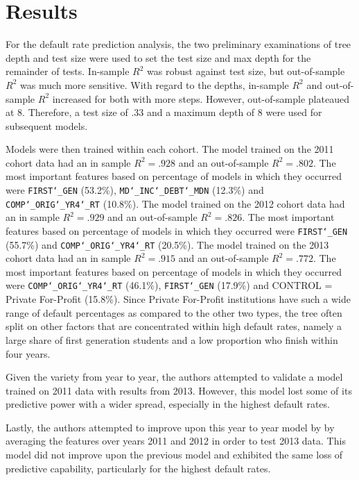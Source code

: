 \documentclass[10pt,twocolumn]{article}
\begin{document}
\section{Results}

For the default rate prediction analysis, the two preliminary examinations of tree depth and test size were used to set the
test size and max depth for the remainder of tests. In-sample $R^2$ was robust against test
 size, but out-of-sample $R^2$ was much more sensitive. With regard to the depths,
in-sample $R^2$ and out-of-sample $R^2$ increased for both with more steps. However,
out-of-sample plateaued at 8. Therefore, a test size of .33 and a maximum depth of 8 were
used for subsequent models.

Models were then trained within each cohort. The model trained on the 2011 cohort data
had an in sample $R^2 = .928$ and an out-of-sample $R^2 = .802$. The most important
features based on percentage of models in which they occurred were \texttt{FIRST\char`_GEN} (53.2\%),
\texttt{MD\char`_INC\char`_DEBT\char`_MDN} (12.3\%) and \texttt{COMP\char`_ORIG\char`_YR4\char`_RT} (10.8\%).
The model trained on the 2012 cohort data
had an in sample $R^2 = .929$ and an out-of-sample $R^2 = .826$. The most important
features based on percentage of models in which they occurred were \texttt{FIRST\char`_GEN} (55.7\%)
and \texttt{COMP\char`_ORIG\char`_YR4\char`_RT} (20.5\%). The model trained on the 2013 cohort data
had an in sample $R^2 = .915$ and an out-of-sample $R^2 = .772$. The most important
features based on percentage of models in which they occurred were
\texttt{COMP\char`_ORIG\char`_YR4\char`_RT} (46.1\%),
\texttt{FIRST\char`_GEN} (17.9\%) and CONTROL = Private For-Profit (15.8\%). Since Private For-Profit
institutions have such a wide range of default percentages as compared to the other two types,
the tree often split on other factors that are concentrated within high default rates, namely
a large share of first generation students and a low proportion who finish within four
years.

Given the variety from year to year, the authors attempted to validate a model
trained on 2011 data with results from 2013. However, this model lost some of its
predictive power with a wider spread, especially in the highest default rates.

Lastly, the authors attempted to improve upon this year to year model by by averaging
the features over years 2011 and 2012 in order to test 2013 data. This model did
not improve upon the previous model and exhibited the same loss of predictive capability,
particularly for the highest default rates.
\end{document}
